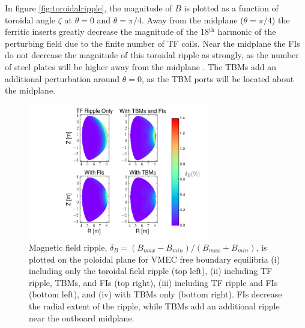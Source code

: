 \documentclass{article}
\numberwithin{figure}{section}
\numberwithin{equation}{section}
\begin{document}
In figure \ref{fig:toroidalripple}, the magnitude of $B$ is plotted as a function of toroidal angle $\zeta$ at $\theta = 0$ and $\theta = \pi/4$. Away from the midplane ($\theta = \pi/4$) the ferritic inserts greatly decrease the magnitude of the 18$^{\text{th}}$ harmonic of the perturbing field due to the finite number of TF coils. Near the midplane the FIs do not decrease the magnitude of this toroidal ripple as strongly, as the number of steel plates will be higher away from the midplane \cite{Shinohara2009}. The TBMs add an additional perturbation around $\theta = 0$, as the TBM ports will be located about the midplane. 

\FloatBarrier

\begin{figure}[h!]
\centering
\includegraphics[width=0.7\textwidth]{ripplecontour.png}
\caption{\label{fig:ripplecontour} Magnetic field ripple, $\delta_B = (B_{max}-B_{min})/(B_{max} + B_{min})$, is plotted on the poloidal plane for VMEC free boundary equilibria (i) including only the toroidal field ripple (top left), (ii) including TF ripple, TBMs, and FIs (top right), (iii) including TF ripple and FIs (bottom left), and (iv) with TBMs only (bottom right). FIs decrease the radial extent of the ripple, while TBMs add an additional ripple near the outboard midplane.}
\end{figure}
\end{document}
